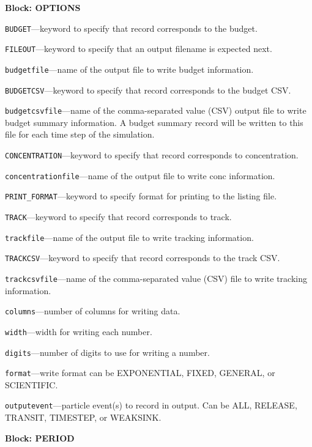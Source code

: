 
\item \textbf{Block: OPTIONS}

\begin{description}
\item \texttt{BUDGET}---keyword to specify that record corresponds to the budget.

\item \texttt{FILEOUT}---keyword to specify that an output filename is expected next.

\item \texttt{budgetfile}---name of the output file to write budget information.

\item \texttt{BUDGETCSV}---keyword to specify that record corresponds to the budget CSV.

\item \texttt{budgetcsvfile}---name of the comma-separated value (CSV) output file to write budget summary information.  A budget summary record will be written to this file for each time step of the simulation.

\item \texttt{CONCENTRATION}---keyword to specify that record corresponds to concentration.

\item \texttt{concentrationfile}---name of the output file to write conc information.

\item \texttt{PRINT\_FORMAT}---keyword to specify format for printing to the listing file.

\item \texttt{TRACK}---keyword to specify that record corresponds to track.

\item \texttt{trackfile}---name of the output file to write tracking information.

\item \texttt{TRACKCSV}---keyword to specify that record corresponds to the track CSV.

\item \texttt{trackcsvfile}---name of the comma-separated value (CSV) file to write tracking information.

\item \texttt{columns}---number of columns for writing data.

\item \texttt{width}---width for writing each number.

\item \texttt{digits}---number of digits to use for writing a number.

\item \texttt{format}---write format can be EXPONENTIAL, FIXED, GENERAL, or SCIENTIFIC.

\item \texttt{outputevent}---particle event(s) to record in output.  Can be ALL, RELEASE, TRANSIT, TIMESTEP, or WEAKSINK.

\end{description}
\item \textbf{Block: PERIOD}

